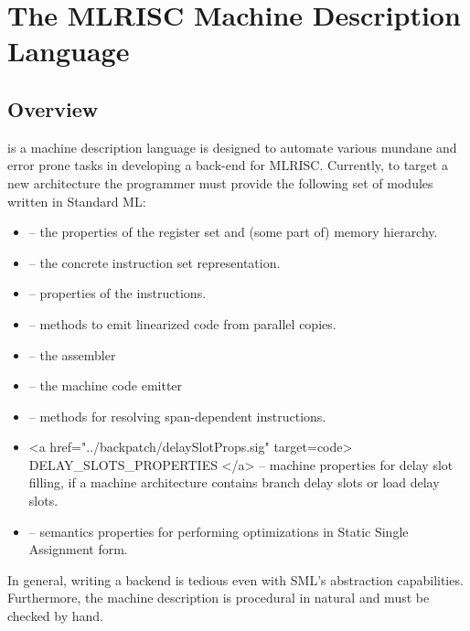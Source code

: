 \section{The MLRISC Machine Description Language}

\subsection{ Overview }

 is a machine description language 
is designed to automate
various mundane and error prone tasks in developing a back-end for 
MLRISC.  Currently, to target a new
architecture the programmer must provide the following set of modules
written in Standard ML:

\begin{itemize}
  \item {} -- 
   the properties of the register set and (some part of) memory hierarchy. 
  \item {} -- 
   the concrete instruction set representation.
  \item {}  --
   properties of the instructions.
  \item {} --
   methods to emit linearized code from parallel copies.
  \item {} --
   the assembler
  \item {} --
   the machine code emitter
  \item {} --
   methods for resolving span-dependent instructions. 
  \item <a href="../backpatch/delaySlotProps.sig" target=code> DELAY_SLOTS_PROPERTIES 
        </a> -- machine properties for delay slot filling, if a machine 
    architecture contains branch delay slots or load delay slots.
  \item {} --
    semantics properties for performing optimizations in Static Single
  Assignment form.
\end{itemize}

In general, writing a backend is tedious even with  
SML's abstraction capabilities. 
Furthermore, the machine description is procedural in natural 
and must be checked by hand.  

